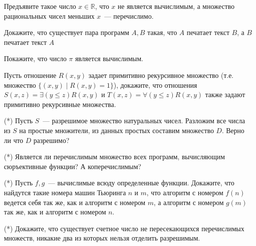 \setcounter{curtask}{1}


\begin{task}
    Предъявите такое число $x \in \mathbb{R}$, что $x$ не является
    вычислимым, а множество рациональных чисел меньших $x$~---
    перечислимо.
\end{task}

\begin{task}
    Докажите, что существует пара программ $A, B$ такая, что $A$
    печатает текст $B$, а $B$ печатает текст $A$
\end{task}

\begin{task}
    Покажите, что число $\pi$ является вычислимым.
\end{task}

\begin{task}
    Пусть отношение $R(x, y)$ задает примитивно рекурсивное множество
    (т.е. множество $\{(x, y) \mid R(x, y) = 1\}$), докажите, что
    отношения $S(x, z) = \exists (y \le z) R(x, y)$ и
    $T(x, z) = \forall (y \le z) R(x, y)$ также задают примитивно
    рекурсивные множества.
\end{task}


\breakline

\begin{task}(*)
    Пусть $S$~--- разрешимое множество натуральных чисел. Разложим все
    числа из $S$ на простые множители, из данных простых составим
    множество $D$. Верно ли что $D$ разрешимо?
\end{task}

\begin{task}(*)
    Является ли перечислимым множество всех программ, вычисляющим
    сюръективные функции? А коперечислимым?
\end{task}

\begin{task}(*)
    Пусть $f, g$~--- вычислимые всюду определенные функции. Докажите,
    что найдутся такие номера машин Тьюринга $n$ и $m$, что алгоритм с
    номером $f(n)$ ведется себя так же, как и алгоритм с номером $m$,
    а алгоритм с номером $g(m)$ так же, как и алгоритм с номером $n$.
\end{task}

\begin{task}(*)
    Докажите, что существует счетное число не пересекающихся
    перечислимых множеств, никакие два из которых нельзя отделить
    разрешимым.
\end{task}
